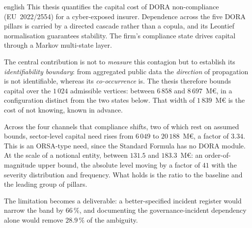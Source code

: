 \begin{otherlanguage*}{english}
This thesis quantifies the capital cost of DORA non-compliance (EU~2022/2554) for a
cyber-exposed insurer. Dependence across the five DORA pillars is carried by a directed cascade
rather than a copula, and its Leontief normalisation guarantees stability. The firm's compliance
state drives capital through a Markov multi-state layer.

The central contribution is not to \emph{measure} this contagion but to establish its
\emph{identifiability boundary}: from aggregated public data the \emph{direction} of propagation
is not identifiable, whereas its \emph{co-occurrence} is. The thesis therefore bounds capital over
the $1\,024$ admissible vertices: between $6\,858$ and $8\,697$~M\euro{}, in a configuration
distinct from the two states below. That width of $1\,839$~M\euro{} is the cost of not knowing,
known in advance.

Across the four channels that compliance shifts, two of which rest on assumed bounds,
sector-level capital need rises from $6\,049$ to $20\,188$~M\euro, a factor of $3.34$. This is an
ORSA-type need, since the Standard Formula has no DORA module. At the scale of a notional entity,
between $131.5$ and $183.3$~M\euro{}: an order-of-magnitude upper bound, the absolute level moving
by a factor of $41$ with the severity distribution and frequency. What holds is the ratio to the
baseline and the leading group of pillars.

The limitation becomes a deliverable: a better-specified incident register would narrow the band
by $66\,\%$, and documenting the governance-incident dependency alone would remove $28.9\,\%$ of
the ambiguity.
\end{otherlanguage*}

\setcounter{tocdepth}{1}
\tableofcontents


